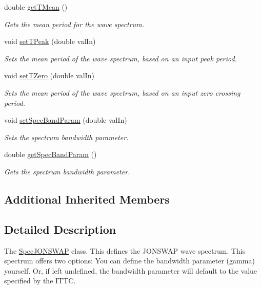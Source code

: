 \begin{DoxyCompactItemize}
double \hyperlink{classosea_1_1_spec_j_o_n_s_w_a_p_ab481fb8ccf7974875f1b4a364dfc3c43}{get\-T\-Mean} ()
\begin{DoxyCompactList}\small\item\em Gets the mean period for the wave spectrum. \end{DoxyCompactList}\item 
void \hyperlink{classosea_1_1_spec_j_o_n_s_w_a_p_a36d7511b90c37df7f64cf62552356acc}{set\-T\-Peak} (double val\-In)
\begin{DoxyCompactList}\small\item\em Sets the mean period of the wave spectrum, based on an input peak period. \end{DoxyCompactList}\item 
void \hyperlink{classosea_1_1_spec_j_o_n_s_w_a_p_a03915a7373f8f3cb9a6e54c528256415}{set\-T\-Zero} (double val\-In)
\begin{DoxyCompactList}\small\item\em Sets the mean period of the wave spectrum, based on an input zero crossing period. \end{DoxyCompactList}\item 
void \hyperlink{classosea_1_1_spec_j_o_n_s_w_a_p_ae14ee73289a7026e96b390b709a17717}{set\-Spec\-Band\-Param} (double val\-In)
\begin{DoxyCompactList}\small\item\em Sets the spectrum bandwidth parameter. \end{DoxyCompactList}\item 
double \hyperlink{classosea_1_1_spec_j_o_n_s_w_a_p_a7191f0e7af02d8f246a35771fec0d462}{get\-Spec\-Band\-Param} ()
\begin{DoxyCompactList}\small\item\em Gets the spectrum bandwidth parameter. \end{DoxyCompactList}\end{DoxyCompactItemize}
\subsection*{Additional Inherited Members}


\subsection{Detailed Description}
The \hyperlink{classosea_1_1_spec_j_o_n_s_w_a_p}{Spec\-J\-O\-N\-S\-W\-A\-P} class. This defines the J\-O\-N\-S\-W\-A\-P wave spectrum. This spectrum offers two options\-: You can define the bandwidth parameter (gamma) yourself. Or, if left undefined, the bandwidth parameter will default to the value specified by the I\-T\-T\-C. 

